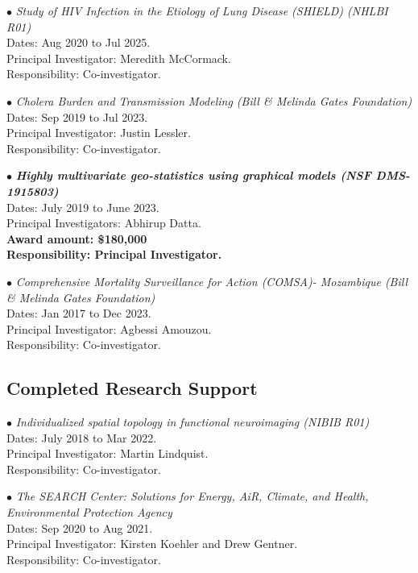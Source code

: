 \documentclass[12pt]{article}
\newcommand{\dn}[1]{{\color{black} {#1}}}
\begin{document}
\item[$\bullet$]
{\it Study of HIV Infection in the Etiology of Lung Disease (SHIELD) (NHLBI R01)}\\[0.0em]
\dn{Dates:} Aug 2020 to Jul 2025.\\
\dn{Principal Investigator:} Meredith McCormack.\\
\dn{Responsibility:} Co-investigator.

\item[$\bullet$]
{\it Cholera Burden and Transmission Modeling (Bill \& Melinda Gates Foundation)}\\[0.0em]
\dn{Dates:} Sep 2019 to Jul 2023.\\
\dn{Principal Investigator:} Justin Lessler.\\
\dn{Responsibility:} Co-investigator.

\item[$\bullet$]
{\it \textbf{Highly multivariate geo-statistics using graphical models (NSF DMS-1915803)}}\\[0.0em]
\dn{Dates:} July 2019 to June 2023.\\
\dn{Principal Investigators:} Abhirup Datta.\\
\textbf{\dn{Award amount:} \$180,000}\\
\textbf{\dn{Responsibility:} Principal Investigator.}

\item[$\bullet$]
{\it Comprehensive Mortality Surveillance for Action (COMSA)- Mozambique (Bill \& Melinda Gates Foundation)}\\[0.0em]
\dn{Dates:} Jan 2017 to Dec 2023.\\
\dn{Principal Investigator:} Agbessi Amouzou.\\
\dn{Responsibility:} Co-investigator.

\subsection*{Completed Research Support}

\item[$\bullet$]
{\it Individualized spatial topology in functional neuroimaging (NIBIB R01)}\\[0.0em]
\dn{Dates:} July 2018 to Mar 2022.\\
\dn{Principal Investigator:} Martin Lindquist.\\
\dn{Responsibility:} Co-investigator.

\item[$\bullet$]
{\it The SEARCH Center: Solutions for Energy, AiR, Climate, and Health, Environmental Protection Agency}\\[0.0em]
\dn{Dates:} Sep 2020 to Aug 2021.\\
\dn{Principal Investigator:} Kirsten Koehler and Drew Gentner.\\
\dn{Responsibility:} Co-investigator.
\end{document}
